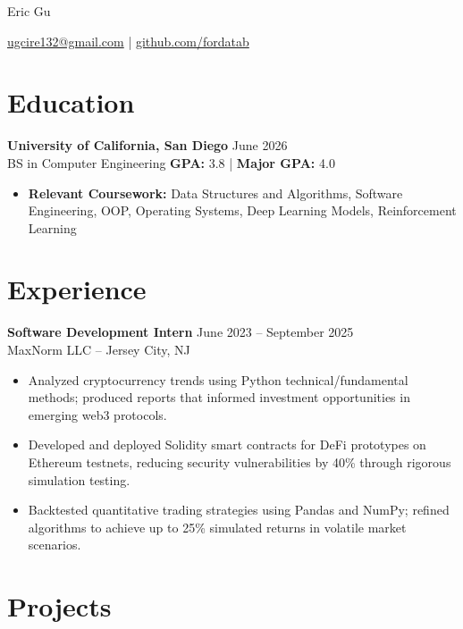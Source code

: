 \documentclass[11pt]{article}
\begin{document}
\centerline{\Huge Eric Gu}
\vspace{2pt}
\centerline{\href{mailto:ugcire132@gmail.com}{ugcire132@gmail.com} | \href{https://github.com/fordatab}{github.com/fordatab}}
\vspace{-10pt}

\section*{Education}
\textbf{University of California, San Diego} \hfill June 2026 \\
BS in Computer Engineering \hfill \textbf{GPA:} 3.8 | \textbf{Major GPA:} 4.0
\vspace{2pt}
\begin{itemize}[leftmargin=*, nosep]
    \item \textbf{Relevant Coursework:} Data Structures and Algorithms, Software Engineering, OOP, Operating Systems, Deep Learning Models, Reinforcement Learning
\end{itemize}
\vspace{-12pt}

\section*{Experience}

\textbf{Software Development Intern} \hfill June 2023 -- September 2025 \\
MaxNorm LLC -- Jersey City, NJ 
\vspace{-2pt}
\begin{itemize}
    \item Analyzed cryptocurrency trends using Python technical/fundamental methods; produced reports that informed investment opportunities in emerging web3 protocols.
    \item Developed and deployed Solidity smart contracts for DeFi prototypes on Ethereum testnets, reducing security vulnerabilities by 40\% through rigorous simulation testing.
    \item Backtested quantitative trading strategies using Pandas and NumPy; refined algorithms to achieve up to 25\% simulated returns in volatile market scenarios.
\end{itemize}
\vspace{-12pt}

\section*{Projects}
\end{document}
